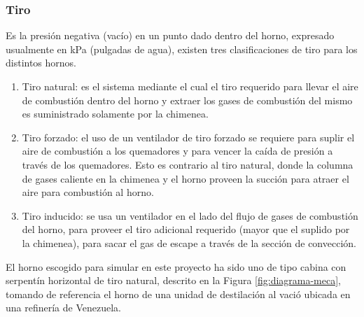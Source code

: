 \subsubsection{Tiro}
\par Es la presión negativa (vacío) en un punto dado dentro del horno, expresado usualmente en kPa (pulgadas de agua), existen tres clasificaciones de tiro para los distintos hornos.
\begin{enumerate}[]
    \item Tiro natural: es el sistema mediante el cual el tiro requerido para llevar el aire de combustión dentro del horno y extraer los gases de combustión del mismo es suministrado solamente por la chimenea.
    \item Tiro forzado: el uso de un ventilador de tiro forzado se requiere para suplir el aire de combustión a los quemadores y para vencer la caída de presión a través de los quemadores. Esto es contrario al tiro natural, donde la columna de gases caliente en la chimenea y el horno proveen la succión para atraer el aire para combustión al horno.
    \item Tiro inducido: se usa un ventilador en el lado del flujo de gases de combustión del horno, para proveer el tiro adicional requerido (mayor que el suplido por la chimenea), para sacar el gas de escape a través de la sección de convección.
\end{enumerate}

\par El horno escogido para simular en este proyecto ha sido uno de tipo cabina con serpentín horizontal de tiro natural, descrito en la Figura \ref{fig:diagrama-meca}, tomando de referencia el horno de una unidad de destilación al vació ubicada en una refinería de Venezuela.

